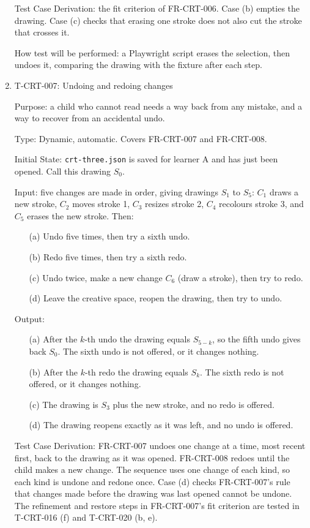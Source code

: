 \documentclass[12pt, titlepage]{article}
\newcommand{\testitem}[1]{\item #1\par\nopagebreak}
\begin{document}
\begin{enumerate}
Test Case Derivation: the fit criterion of FR-CRT-006. Case (b) empties the
drawing. Case (c) checks that erasing one stroke does not also cut the
stroke that crosses it.

How test will be performed: a Playwright script erases the selection, then
undoes it, comparing the drawing with the fixture after each step.

\testitem{T-CRT-007: Undoing and redoing changes}

Purpose: a child who cannot read needs a way back from any mistake, and a way
to recover from an accidental undo.

Type: Dynamic, automatic. Covers FR-CRT-007 and FR-CRT-008.

Initial State: \texttt{crt-three.json} is saved for learner A and has just
been opened. Call this drawing $S_0$.

Input: five changes are made in order, giving drawings $S_1$ to $S_5$:
$C_1$ draws a new stroke, $C_2$ moves stroke 1, $C_3$ resizes stroke 2, $C_4$
recolours stroke 3, and $C_5$ erases the new stroke. Then:
\begin{itemize}
\item[(a)] Undo five times, then try a sixth undo.
\item[(b)] Redo five times, then try a sixth redo.
\item[(c)] Undo twice, make a new change $C_6$ (draw a stroke), then try to
redo.
\item[(d)] Leave the creative space, reopen the drawing, then try to undo.
\end{itemize}

Output:
\begin{itemize}
\item[(a)] After the $k$-th undo the drawing equals $S_{5-k}$, so the fifth
undo gives back $S_0$. The sixth undo is not offered, or it changes nothing.
\item[(b)] After the $k$-th redo the drawing equals $S_k$. The sixth redo is
not offered, or it changes nothing.
\item[(c)] The drawing is $S_3$ plus the new stroke, and no redo is offered.
\item[(d)] The drawing reopens exactly as it was left, and no undo is
offered.
\end{itemize}

Test Case Derivation: FR-CRT-007 undoes one change at a time, most recent
first, back to the drawing as it was opened. FR-CRT-008 redoes until the
child makes a new change. The sequence uses one change of each kind, so each
kind is undone and redone once. Case (d) checks FR-CRT-007's rule that
changes made before the drawing was last opened cannot be undone. The
refinement and restore steps in FR-CRT-007's fit criterion are tested in
T-CRT-016 (f) and T-CRT-020 (b, e).


\end{enumerate}
\end{document}
